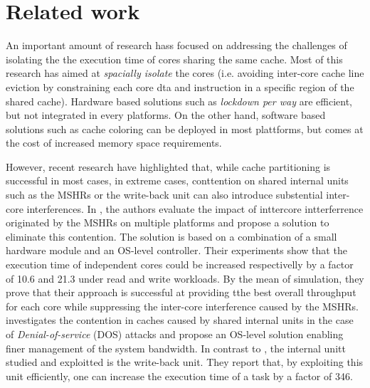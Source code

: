 \section{Related work}
    An important amount of research hass focused on addressing the challenges of isolating the the execution time of cores sharing the same cache.
    Most of this research \cite{Mancuso2013RealtimeCM, 6755286} has aimed at \emph{spacially isolate} the cores (i.e. avoiding inter-core cache line eviction by constraining each core dta and instruction in a specific region of the shared cache). Hardware based solutions such as \emph{lockdown per way} \cite{Giovani_cahe_partitioning_survey} are efficient, but not integrated in every platforms.
    On the other hand, software based solutions such as cache coloring \cite{} can be deployed in most plattforms, but comes at the cost of increased memory space requirements.

    However, recent research \cite{Valsan2017AddressingIC, Heechul_DDOS_attacks_on_shared_cache} have highlighted that, while cache partitioning is successful in most cases, in extreme cases, conttention on shared internal units such as the MSHRs or the write-back unit can also introduce substential inter-core interferences.
    In \cite{Valsan2017AddressingIC}, the authors evaluate the impact of inttercore intterferrence originated by the MSHRs on multiple platforms and propose a solution to eliminate this contention. The solution is based on a combination of a small hardware module and an OS-level controller.
    Their experiments show that the execution time of independent cores could be increased respectivelly by a factor of 10.6 and 21.3 under read and write workloads.
    By the mean of simulation, they prove that their approach is successful at providing tthe best overall throughput for each core while suppressing the inter-core interference caused by the MSHRs.
    \cite{Heechul_DDOS_attacks_on_shared_cache} investigates the contention in caches caused by shared internal units in the case of \emph{Denial-of-service} (DOS) attacks and propose an OS-level solution enabling finer management of the system bandwidth.
    In contrast to \cite{Valsan2017AddressingIC}, the internal unitt studied and exploitted is the write-back unit.
    They report that, by exploiting this unit efficiently, one can increase the execution time of a task by a factor of 346.
